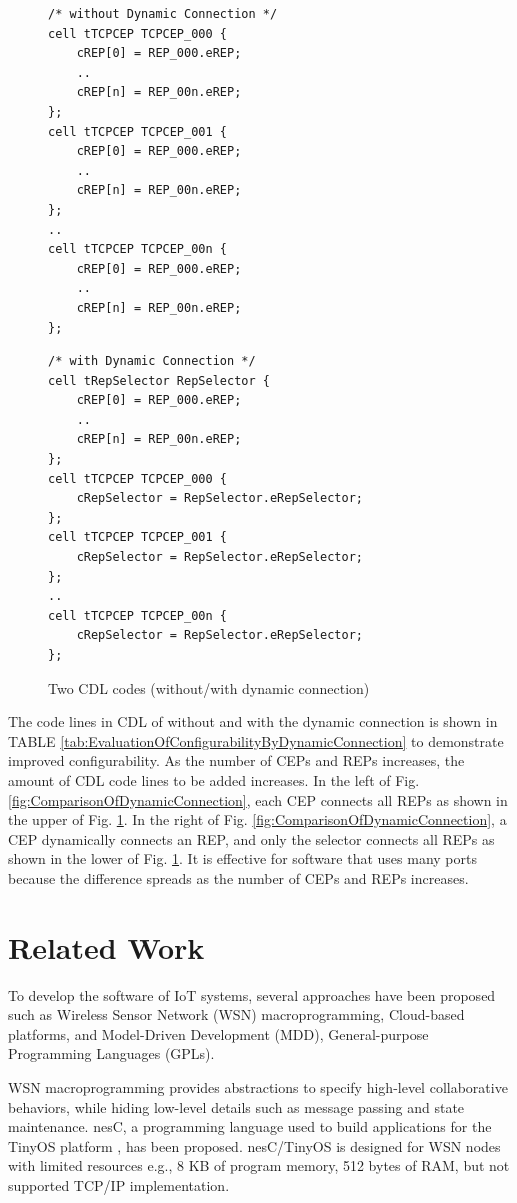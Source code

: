 \documentclass[a4j,12pt,oneside,openany,english]{jsbook}
\begin{document}
\begin{figure}[t]
 \centering
 \begin{lstlisting}
/* without Dynamic Connection */
cell tTCPCEP TCPCEP_000 {
    cREP[0] = REP_000.eREP;
    ..
    cREP[n] = REP_00n.eREP;
};
cell tTCPCEP TCPCEP_001 {
    cREP[0] = REP_000.eREP;
    ..
    cREP[n] = REP_00n.eREP;
};
..
cell tTCPCEP TCPCEP_00n {
    cREP[0] = REP_000.eREP;
    ..
    cREP[n] = REP_00n.eREP;
};
 \end{lstlisting}
 \centering
 \begin{lstlisting}
/* with Dynamic Connection */
cell tRepSelector RepSelector {
    cREP[0] = REP_000.eREP;
    ..
    cREP[n] = REP_00n.eREP;
};
cell tTCPCEP TCPCEP_000 {
    cRepSelector = RepSelector.eRepSelector;
};
cell tTCPCEP TCPCEP_001 {
    cRepSelector = RepSelector.eRepSelector;
};
..
cell tTCPCEP TCPCEP_00n {
    cRepSelector = RepSelector.eRepSelector;
};
 \end{lstlisting}
 \caption{Two CDL codes (without/with dynamic connection)}
 \label{src:ComparisonOfCDL}
\end{figure}

The code lines in CDL of without and with the dynamic connection is shown in TABLE \ref{tab:EvaluationOfConfigurabilityByDynamicConnection} to demonstrate improved configurability.
As the number of CEPs and REPs increases, the amount of CDL code lines to be added increases.
In the left of Fig. \ref{fig:ComparisonOfDynamicConnection}, each CEP connects all REPs as shown in the upper of Fig. \ref{src:ComparisonOfCDL}. 
In the right of Fig. \ref{fig:ComparisonOfDynamicConnection}, a CEP dynamically connects an REP, and only the selector connects all REPs as shown in the lower of Fig. \ref{src:ComparisonOfCDL}. 
It is effective for software that uses many ports because the difference spreads as the number of CEPs and REPs increases.



\chapter{Related Work}
\label{sec:Related Work}

To develop the software of IoT systems, several approaches have been proposed \cite{par:frameworkCPS} such as Wireless Sensor Network (WSN) macroprogramming, Cloud-based platforms, and Model-Driven Development (MDD), General-purpose Programming Languages (GPLs).

WSN macroprogramming provides abstractions to specify high-level collaborative behaviors, while hiding low-level details such as message passing and state maintenance.
nesC, a programming language used to build applications for the TinyOS platform \cite{par:nesc}, has been proposed.
nesC/TinyOS is designed for WSN nodes with limited resources e.g., 8 KB of program memory, 512 bytes of RAM, but not supported TCP/IP implementation.
\end{document}
